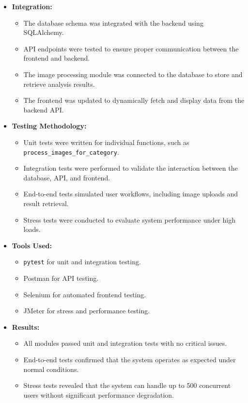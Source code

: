 \documentclass[12pt,a4paper]{report}
\begin{document}
\begin{itemize}
    \item \textbf{Integration:} 
    \begin{itemize}
        \item The database schema was integrated with the backend using SQLAlchemy.
        \item API endpoints were tested to ensure proper communication between the frontend and backend.
        \item The image processing module was connected to the database to store and retrieve analysis results.
        \item The frontend was updated to dynamically fetch and display data from the backend API.
    \end{itemize}
    \item \textbf{Testing Methodology:}
    \begin{itemize}
        \item Unit tests were written for individual functions, such as \texttt{process\_images\_for\_category}.
        \item Integration tests were performed to validate the interaction between the database, API, and frontend.
        \item End-to-end tests simulated user workflows, including image uploads and result retrieval.
        \item Stress tests were conducted to evaluate system performance under high loads.
    \end{itemize}
    \item \textbf{Tools Used:}
    \begin{itemize}
        \item \texttt{pytest} for unit and integration testing.
        \item Postman for API testing.
        \item Selenium for automated frontend testing.
        \item JMeter for stress and performance testing.
    \end{itemize}
    \item \textbf{Results:}
    \begin{itemize}
        \item All modules passed unit and integration tests with no critical issues.
        \item End-to-end tests confirmed that the system operates as expected under normal conditions.
        \item Stress tests revealed that the system can handle up to 500 concurrent users without significant performance degradation.

\end{itemize}
\end{itemize}
\end{document}

